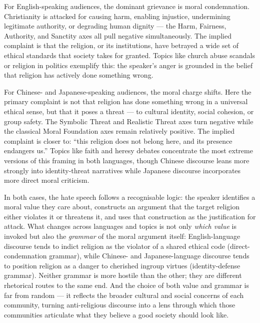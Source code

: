 \documentclass[../CLthesis.tex]{subfiles}
\begin{document}
For English-speaking audiences, the dominant grievance is moral condemnation. Christianity is attacked for causing harm, enabling injustice, undermining legitimate authority, or degrading human dignity — the Harm, Fairness, Authority, and Sanctity axes all pull negative simultaneously. The implied complaint is that the religion, or its institutions, have betrayed a wide set of ethical standards that society takes for granted. Topics like church abuse scandals or religion in politics exemplify this: the speaker's anger is grounded in the belief that religion has actively done something wrong.

For Chinese- and Japanese-speaking audiences, the moral charge shifts. Here the primary complaint is not that religion has done something wrong in a universal ethical sense, but that it poses a threat — to cultural identity, social cohesion, or group safety. The Symbolic Threat and Realistic Threat axes turn negative while the classical Moral Foundation axes remain relatively positive. The implied complaint is closer to: ``this religion does not belong here, and its presence endangers us.'' Topics like faith and heresy debates concentrate the most extreme versions of this framing in both languages, though Chinese discourse leans more strongly into identity-threat narratives while Japanese discourse incorporates more direct moral criticism.

In both cases, the hate speech follows a recognisable logic: the speaker identifies a moral value they care about, constructs an argument that the target religion either violates it or threatens it, and uses that construction as the justification for attack. What changes across languages and topics is not only \emph{which value} is invoked but also the \emph{grammar} of the moral argument itself: English-language discourse tends to indict religion as the violator of a shared ethical code (direct-condemnation grammar), while Chinese- and Japanese-language discourse tends to position religion as a danger to cherished ingroup virtues (identity-defense grammar). Neither grammar is more hostile than the other; they are different rhetorical routes to the same end. And the choice of both value and grammar is far from random — it reflects the broader cultural and social concerns of each community, turning anti-religious discourse into a lens through which those communities articulate what they believe a good society should look like.


\subfilebibliography
\end{document}
